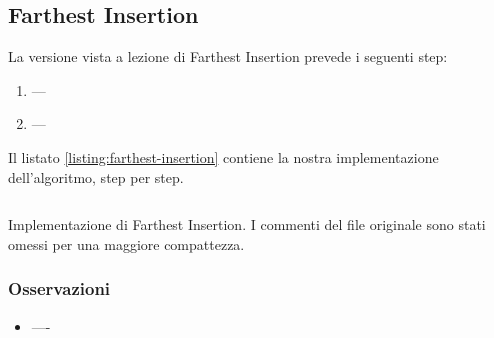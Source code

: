 \newpage


\subsection{Farthest Insertion}

La versione vista a lezione di Farthest Insertion prevede i seguenti step:

\begin{enumerate}
    \item ---
    \item ---
\end{enumerate}

\noindent Il listato \ref{listing:farthest-insertion} contiene la nostra implementazione dell'algoritmo, step per step.

\begin{listing}[!ht]
\begin{verbatim}

\end{verbatim}
\caption{Implementazione di Farthest Insertion. I commenti del file originale sono stati omessi per una maggiore compattezza.}
\label{listing:farthest-insertion}
\end{listing}

\subsubsection{Osservazioni}
\begin{itemize}
    \item ----\\

\end{itemize}
